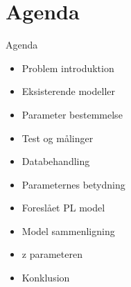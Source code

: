 \section{Agenda}
\begin{frame}{Agenda}
\begin{itemize}
\item Problem introduktion
\item Eksisterende modeller
\item Parameter bestemmelse
\item Test og målinger
\item Databehandling
\item Parameternes betydning
\item Foreslået PL model
\item Model sammenligning
\item z parameteren
\item Konklusion
\end{itemize}
\end{frame}
